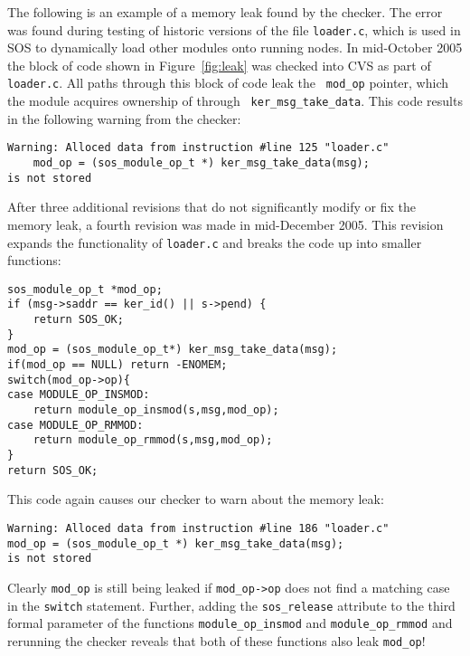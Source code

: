 The following is an example of a memory leak found by the checker.
The error was found during testing of historic versions of the file
{\tt loader.c},
which is used in SOS to dynamically load other modules onto running nodes.  
In mid-October 2005 the block of code shown in Figure~\ref{fig:leak} was
checked into CVS as part of {\tt loader.c}.
All paths through this block of code leak the {\tt
mod\_op} pointer, which the module acquires ownership of through {\tt
  ker\_msg\_take\_data}.
This code results in the following warning from the checker:

\begin{footnotesize}
\begin{verbatim}
Warning: Alloced data from instruction #line 125 "loader.c"
    mod_op = (sos_module_op_t *) ker_msg_take_data(msg);
is not stored
\end{verbatim}
\end{footnotesize}

After three additional revisions that do not significantly modify or fix the
memory leak, a fourth revision was made in mid-December 2005.  This
revision expands the functionality of {\tt loader.c} and breaks
the code up into smaller functions:

\begin{footnotesize}
\begin{verbatim}
sos_module_op_t *mod_op;
if (msg->saddr == ker_id() || s->pend) {
    return SOS_OK;
}
mod_op = (sos_module_op_t*) ker_msg_take_data(msg);
if(mod_op == NULL) return -ENOMEM;
switch(mod_op->op){
case MODULE_OP_INSMOD:
    return module_op_insmod(s,msg,mod_op);
case MODULE_OP_RMMOD:
    return module_op_rmmod(s,msg,mod_op);
}
return SOS_OK;
\end{verbatim}
\end{footnotesize}

This code again causes our checker to warn about the memory leak:

\begin{footnotesize}
\begin{verbatim}
Warning: Alloced data from instruction #line 186 "loader.c"
mod_op = (sos_module_op_t *) ker_msg_take_data(msg);
is not stored
\end{verbatim}
\end{footnotesize}

Clearly {\tt mod\_op} is still being leaked if {\tt mod\_op->op} does not
find a matching case in the {\tt switch} statement.
Further, adding the {\tt sos\_release} attribute to the third formal
parameter of the functions
{\tt module\_op\_insmod} and {\tt module\_op\_rmmod} and rerunning the
checker 
reveals that both of these
functions also leak {\tt mod\_op}!

